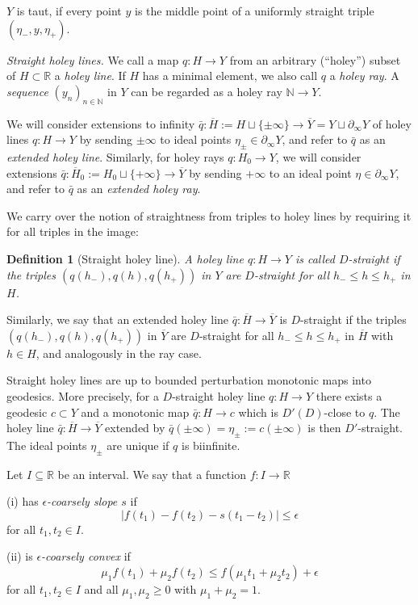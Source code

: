 \documentclass[12pt]{article}
\theoremstyle{boldplain}
\theoremstyle{bolddefinition}
\newtheorem{definition}[equation]{Definition}
\numberwithin{equation}{section}
\def\R{{\mathbb R}}
\def\N{{\mathbb N}}
\def\eps{\epsilon}
\def\geo{\partial_{\infty}}
\def\ol{\overline}
\begin{document}
$Y$ is taut, 
if every point $y$ is the middle point of a uniformly straight triple $(\eta_-,y,\eta_+)$.


\medskip 
{\em Straight holey lines.} 
We call a map $q:H\to Y$ from an arbitrary (``holey'') subset of $H\subset\R$ 
a {\em holey line}.
If $H$ has a minimal element, we also call $q$ a {\em holey ray}.
A {\em sequence} $(y_n)_{n\in\N}$ in $Y$ can be regarded as a holey ray $\N\to Y$.

We will consider extensions to infinity $\bar q:\ol H:=H\sqcup\{\pm\infty\}\to\ol Y=Y\sqcup\geo Y$ of holey lines $q:H\to Y$ 
by sending $\pm\infty$ to ideal points $\eta_{\pm}\in\geo Y$,
and refer to $\bar q$ as an {\em extended holey line}.
Similarly,
for holey rays $q:H_0\to Y$, we will consider extensions $\bar q:\ol H_0:=H_0\sqcup\{+\infty\}\to\ol Y$ 
by sending $+\infty$ to an ideal point $\eta\in\geo Y$, 
and refer to $\bar q$ as an {\em extended holey ray}.

We carry over the notion of straightness from triples to holey lines by requiring it for all triples in the image:
\begin{definition}[Straight holey line] 
\label{def:strspm}
A holey line $q:H\to Y$ is called {\em $D$-straight}
if the triples $(q(h_-), q(h), q(h_+))$ in $Y$ are $D$-straight for all $h_-\leq h\leq h_+$ in $H$. 
\end{definition}

Similarly, we say that an extended holey line $\bar q:\ol H\to\ol Y$ is $D$-straight
if the triples $(q(h_-), q(h), q(h_+))$ in $\ol Y$ are $D$-straight for all $h_-\leq h\leq h_+$ in $\ol H$ with $h\in H$,
and analogously in the ray case.

Straight holey lines are up to bounded perturbation monotonic maps into geodesics.
More precisely,
for a $D$-straight holey line $q:H\to Y$
there exists a geodesic $c\subset Y$ and a monotonic map $\bar q:H\to c$
which is $D'(D)$-close to $q$. 
The holey line $\bar q:\ol H\to\ol Y$
extended by $\bar q(\pm\infty)=\eta_{\pm}:=c(\pm\infty)$
is then $D'$-straight.
The ideal points $\eta_{\pm}$ are unique if $q$ is biinfinite.

\medskip 
Let $I\subseteq\R$ be an interval. 
We say that a function $f:I\to\R$ 

(i) 
has {\em $\eps$-coarsely slope $s$} if 
$$|f(t_1)-f(t_2)-s(t_1-t_2)| \leq \eps $$
for all $t_1,t_2\in I$.

(ii) 
is {\em $\eps$-coarsely convex} if 
$$\mu_1 f(t_1)+\mu_2 f(t_2)\leq f(\mu_1t_1+\mu_2t_2) +\eps $$
for all $t_1,t_2\in I$ and all $\mu_1,\mu_2\geq0$ with $\mu_1+\mu_2=1$.
\end{document}
